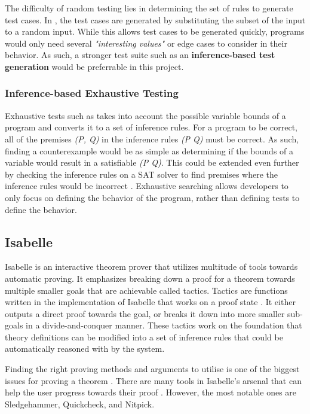 The difficulty of random testing lies in determining the set of rules to generate test cases. In \cite{differentialTesting}, the test cases 
are generated by substituting the subset of the input to a random input. While this allows test cases to be generated quickly, programs would only 
need several \emph{"interesting values"} or edge cases to consider in their behavior. As such, a stronger test suite such as an 
\textbf{inference-based test generation} would be preferrable in this project.

\subsubsection{Inference-based Exhaustive Testing}
\label{sec:inferenceTesting}

Exhaustive tests such as \cite{isabelleQuickcheck} takes into account the possible variable bounds of a program and converts it to a set of 
inference rules. For a program to be correct, all of the premises \emph{(P, Q)} in the inference rules \emph{(P \rightarrow Q)} must be correct. As 
such, finding a counterexample would be as simple as determining if the bounds of a variable would result in a satisfiable \emph{\lnot(P \rightarrow Q)}. 
This could be extended even further by checking the inference rules on a SAT solver to find premises where the inference rules would be incorrect 
\cite[Ch. 5]{isabelleProof}. Exhaustive searching allows developers to only focus on defining the behavior of the program, rather than defining 
tests to define the behavior.

\subsection{Isabelle}
\label{sec:Isabelle}

Isabelle is an interactive theorem prover that utilizes multitude of tools towards automatic proving. It emphasizes breaking down a proof 
for a theorem towards multiple smaller goals that are achievable called tactics. Tactics are functions written in the implementation of Isabelle 
that works on a proof state \cite{isabelleProof}. It either outputs a direct proof towards the goal, or breaks it down into more smaller sub-goals 
in a divide-and-conquer manner. These tactics work on the foundation that theory definitions can be modified into a set of inference rules that 
could be automatically reasoned with by the system.

Finding the right proving methods and arguments to utilise is one of the biggest issues for proving a theorem \cite{isabelleProof}. There are 
many tools in Isabelle's arsenal that can help the user progress towards their proof \cite{IsabelleHOL}. However, the most notable ones are 
Sledgehammer, Quickcheck, and Nitpick.

